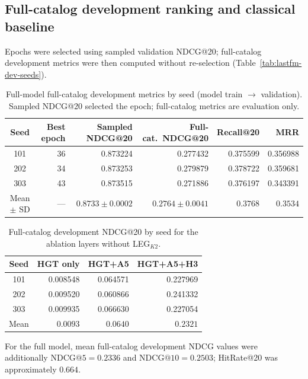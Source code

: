 \subsection{Full-catalog development ranking and classical baseline}
\label{sec:lastfm-fullrank}

Epochs were selected using sampled validation NDCG@20; full-catalog development metrics were then computed without re-selection (Table~\ref{tab:lastfm-dev-seeds}).

\begin{table}[htbp]
\centering
\footnotesize
\caption{Full-model full-catalog development metrics by seed (model train $\to$ validation).
Sampled NDCG@20 selected the epoch; full-catalog metrics are evaluation only.}
\label{tab:lastfm-dev-seeds}
\label{tab:lastfm-true-final}
\setlength{\tabcolsep}{3pt}
\begin{tabular}{@{}crrrrr@{}}
\toprule
Seed & Best epoch & Sampled NDCG@20 & Full-cat.\ NDCG@20 & Recall@20 & MRR \\
\midrule
101 & 36 & 0.873224 & 0.277432 & 0.375599 & 0.356988 \\
202 & 34 & 0.873253 & 0.279879 & 0.378722 & 0.359681 \\
303 & 43 & 0.873515 & 0.271886 & 0.376197 & 0.343391 \\
\midrule
Mean \(\pm\) SD & --- & \(0.8733\pm 0.0002\) & \(0.2764\pm 0.0041\) & \(0.3768\) & \(0.3534\) \\
\bottomrule
\end{tabular}
\end{table}

\begin{table}[htbp]
\centering
\small
\caption{Full-catalog development NDCG@20 by seed for the ablation layers without LEG$_{K2}$.}
\label{tab:lastfm-fullrank-ablation}
\setlength{\tabcolsep}{4pt}
\begin{tabular}{crrr}
\toprule
Seed & HGT only & HGT+A5 & HGT+A5+H3 \\
\midrule
101 & 0.008548 & 0.064571 & 0.227969 \\
202 & 0.009520 & 0.060866 & 0.241332 \\
303 & 0.009935 & 0.066630 & 0.227054 \\
\midrule
Mean & \(0.0093\) & \(0.0640\) & \(0.2321\) \\
\bottomrule
\end{tabular}
\end{table}

For the full model, mean full-catalog development NDCG values were additionally $\mathrm{NDCG}@5=0.2336$ and $\mathrm{NDCG}@10=0.2503$; HitRate@20 was approximately $0.664$.

